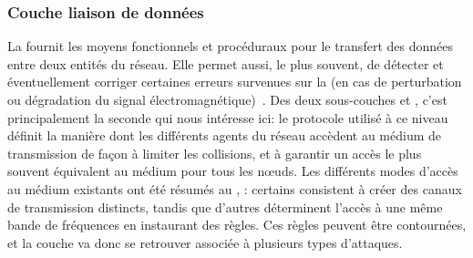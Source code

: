     \subsubsection{Couche liaison de données}
La  fournit les moyens fonctionnels et procéduraux pour le transfert des données entre deux entités du réseau.
Elle permet aussi, le plus souvent, de détecter et éventuellement corriger certaines erreurs survenues sur la  (en cas de perturbation ou dégradation du signal électromagnétique)~\cite{TW10}.
Des deux sous-couches \llc et \mac, c'est principalement la seconde qui nous intéresse ici: le protocole utilisé à ce niveau définit la manière dont les différents agents du réseau accèdent au médium de transmission de façon à limiter les collisions, et à garantir un accès le plus souvent équivalent au médium pour tous les nœuds.
Les différents modes d'accès au médium existants ont été résumés au , : certains consistent à créer des canaux de transmission distincts, tandis que d'autres déterminent l'accès à une même bande de fréquences en instaurant des règles.
Ces règles peuvent être contournées, et la couche \mac va donc se retrouver associée à plusieurs types d'attaques.

